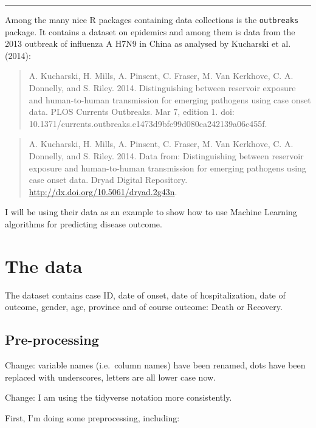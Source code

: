 \documentclass[]{book}
\begin{document}
\begin{center}\rule{0.5\linewidth}{\linethickness}\end{center}

Among the many nice R packages containing data collections is the \texttt{outbreaks} package. It contains a dataset on epidemics and among them is data from the 2013 outbreak of influenza A H7N9 in China as analysed by Kucharski et al. (2014):

\begin{quote}
A. Kucharski, H. Mills, A. Pinsent, C. Fraser, M. Van Kerkhove, C. A. Donnelly, and S. Riley. 2014. Distinguishing between reservoir exposure and human-to-human transmission for emerging pathogens using case onset data. PLOS Currents Outbreaks. Mar 7, edition 1. doi: 10.1371/currents.outbreaks.e1473d9bfc99d080ca242139a06c455f.
\end{quote}

\begin{quote}
A. Kucharski, H. Mills, A. Pinsent, C. Fraser, M. Van Kerkhove, C. A. Donnelly, and S. Riley. 2014. Data from: Distinguishing between reservoir exposure and human-to-human transmission for emerging pathogens using case onset data. Dryad Digital Repository. \url{http://dx.doi.org/10.5061/dryad.2g43n}.
\end{quote}

I will be using their data as an example to show how to use Machine Learning algorithms for predicting disease outcome.

\hypertarget{the-data}{%
\section{The data}\label{the-data}}

The dataset contains case ID, date of onset, date of hospitalization, date of outcome, gender, age, province and of course outcome: Death or Recovery.

\hypertarget{pre-processing}{%
\subsection{Pre-processing}\label{pre-processing}}

Change: variable names (i.e.~column names) have been renamed, dots have been replaced with underscores, letters are all lower case now.

Change: I am using the tidyverse notation more consistently.

First, I'm doing some preprocessing, including:
\end{document}
